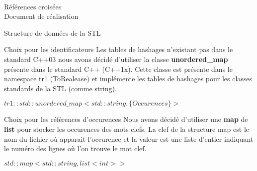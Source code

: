 \documentclass{article}
\begin{document}
\fancyfoot[]{}
\begin{center}
\Huge{\ \\[6em]Références croisées \\ Document de réalisation}
\end{center}

\newpage

\fancyfoot[]{}
\setcounter{tocdepth}{4}
\tableofcontents

\newpage

\fancyfoot[C]{\thepage}


\begin{section}{Structure de données de la STL}

  \begin{subsection}{Choix pour les identificateurs}
  Les tables de hashages n'existant pas dans le standard C++03 nous avons décidé d'utiliser la classe \textbf{unordered\_map} présente 
  dans le standard C++ (C++1x). Cette classe est présente dans le namespace tr1 (ToRealease) et implémente les tables de hashages
  pour les classes standards de la STL (comme string).

  \begin{center}
	\textbf{$tr1::std::unordered\_map<std::string, \{Occurences\}>$}
      \end{center}
  \end{subsection}

  \begin{subsection}{Choix pour les références d'occurences}
  Nous avons décidé d'utiliser une \textbf{map} de \textbf{list} pour stocker les occurences des mots clefs.
  La clef de la structure map est le nom du fichier où apparait l'occurence et la valeur est une liste d'entier indiquant
  le numéro des lignes où l'on trouve le mot clef.

  \begin{center}
	\textbf{$std::map<std::string, list<int>>$}
      \end{center}
  \end{subsection}

\end{section}
\end{document}
